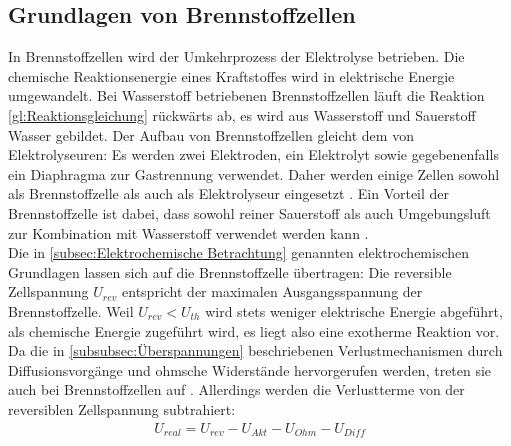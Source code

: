\subsection{Grundlagen von Brennstoffzellen}
\label{subsec:BZ}
In Brennstoffzellen wird der Umkehrprozess der Elektrolyse betrieben. Die chemische Reaktionsenergie eines Kraftstoffes wird in elektrische Energie umgewandelt. Bei Wasserstoff betriebenen Brennstoffzellen läuft die Reaktion \ref{gl:Reaktionsgleichung} rückwärts ab, es wird aus Wasserstoff und Sauerstoff Wasser gebildet. Der Aufbau von Brennstoffzellen gleicht dem von Elektrolyseuren: Es werden zwei Elektroden, ein Elektrolyt sowie gegebenenfalls ein Diaphragma zur Gastrennung verwendet. Daher werden einige Zellen sowohl als Brennstoffzelle als auch als Elektrolyseur eingesetzt \citep{yan_performance_2017}. Ein Vorteil der Brennstoffzelle ist dabei, dass sowohl reiner Sauerstoff als auch Umgebungsluft zur Kombination mit Wasserstoff verwendet werden kann \citep{olabi_prospects_2020,jiao_challenges_2017}.\\
Die in \ref{subsec:Elektrochemische Betrachtung} genannten elektrochemischen Grundlagen lassen sich auf die Brennstoffzelle übertragen: Die reversible Zellspannung $U_{rev}$ entspricht der maximalen Ausgangsspannung der Brennstoffzelle. Weil $U_{rev} < U_{th}$ wird stets weniger elektrische Energie abgeführt, als chemische Energie zugeführt wird, es liegt also eine exotherme Reaktion vor. Da die in \ref{subsubsec:Überspannungen} beschriebenen Verlustmechanismen durch Diffusionsvorgänge und ohmsche Widerstände hervorgerufen werden, treten sie auch bei Brennstoffzellen auf \citep{chugh_experimental_2020}. Allerdings werden die Verlustterme von der reversiblen Zellspannung subtrahiert:\\
\begin{align}
	\label{gl:U_real-BZ}
	U_{real} =  U_{rev} - U_{Akt} - U_{Ohm} - U_{Diff}
\end{align}   

